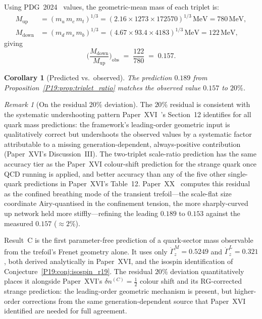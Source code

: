\documentclass[11pt,a4paper]{article}
\newtheorem{corollary}[theorem]{Corollary}
\theoremstyle{definition}\newtheorem{definition}[theorem]{Definition}
\theoremstyle{remark}
\newtheorem{remark}[theorem]{Remark}
\newcommand{\tang}{\dot\Gamma}
\begin{document}
Using PDG~2024~\cite{PDG2024} values, the geometric-mean mass of
each triplet is:
\begin{align}
  M_{\mathrm{up}} &= (m_u\,m_c\,m_t)^{1/3}
  = (2.16\times 1273\times 172570)^{1/3}\,\mathrm{MeV}
  = 780\,\mathrm{MeV}, \\
  M_{\mathrm{down}} &= (m_d\,m_s\,m_b)^{1/3}
  = (4.67\times 93.4\times 4183)^{1/3}\,\mathrm{MeV}
  = 122\,\mathrm{MeV},
\end{align}
giving
\begin{equation}
  \biggl(\frac{M_{\mathrm{down}}}{M_{\mathrm{up}}}\biggr)_{\!\mathrm{obs}}
  \;=\; \frac{122}{780} \;=\; 0.157.
  \label{P19:eq:triplet_ratio_obs}
\end{equation}

\begin{corollary}[Predicted vs.\ observed]
\label{P19:cor:triplet_agreement}
The prediction $0.189$ from
Proposition~\ref{P19:prop:triplet_ratio} matches the observed value
$0.157$ to $20\%$.
\end{corollary}

\begin{remark}[On the residual $20\%$ deviation]
\label{P19:rem:triplet_deviation}
The $20\%$ residual is consistent with the systematic
undershooting pattern Paper~XVI~\cite{Paper16}'s Section~12
identifies for all quark mass predictions: the framework's
leading-order geometric input is qualitatively correct but
undershoots the observed values by a systematic factor
attributable to a missing generation-dependent, always-positive
contribution (Paper~XVI's Discussion~III).  The two-triplet
scale-ratio prediction has the same accuracy tier as the
Paper~XVI colour-shift prediction for the strange quark once
QCD running is applied, and better accuracy than any of the
five other single-quark predictions in Paper~XVI's Table~12.
Paper~XX~\cite{Paper20} computes this residual as the confined
breathing mode of the transient trefoil---the scale-flat size
coordinate Airy-quantised in the confinement tension, the
more sharply-curved up network held more stiffly---refining the
leading $0.189$ to $0.153$ against the measured $0.157$ ($\approx2\%$).
\end{remark}

Result~C is the first parameter-free prediction of a
quark-sector mass observable from the trefoil's Frenet geometry
alone.  It uses only $\tang_z^M=0.5249$ and $\tang_z^L=0.321$,
both derived analytically in Paper~XVI, and the isospin identification
of Conjecture~\ref{P19:conj:isospin_r19}.  The residual $20\%$
deviation quantitatively places it alongside Paper~XVI's
$\delta n^{(C)}=\tfrac12$ colour shift and its RG-corrected strange
prediction: the leading-order geometric mechanism is present, but
higher-order corrections from the same generation-dependent source
that Paper~XVI identified are needed for full agreement.
\end{document}
